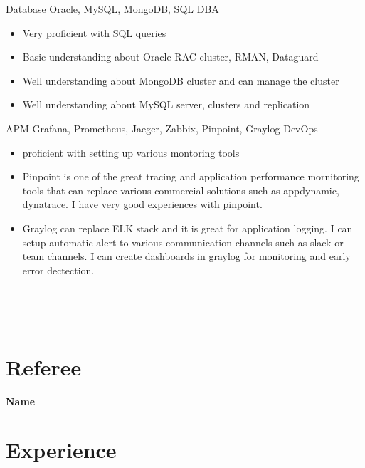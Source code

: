 \documentclass[]{friggeri-cv}
\begin{document}
\begin{entrylist}
{\begin{itemize}
    \end{itemize}}
  \entry
  {Database}
  {Oracle, MySQL, MongoDB, SQL}
  {DBA}
  { \begin{itemize}
      \item Very proficient with SQL queries
      \item Basic understanding about Oracle RAC cluster, RMAN, Dataguard
      \item Well understanding about MongoDB cluster and can manage the cluster
      \item Well understanding about MySQL server, clusters and replication
    \end{itemize}}
  \entry
  {APM}
  {Grafana, Prometheus, Jaeger, Zabbix, Pinpoint, Graylog}
  {DevOps}
  { \begin{itemize}
      \item proficient with setting up various montoring tools
      \item Pinpoint is one of the great tracing and application performance mornitoring tools that can replace various commercial solutions such as appdynamic, dynatrace. I have very good experiences with pinpoint.
      \item Graylog can replace ELK stack and it is great for application logging. I can setup automatic alert to various communication channels such as slack or team channels. I can create dashboards in graylog for monitoring and early error dectection.
    \end{itemize}}
\end{entrylist}
\newpage
~

\begin{aside}
  ~
  ~
  ~
  ~
  \section{Referee}
  \textbf{Name}
\end{aside}
\section{Experience}
~
\end{document}
